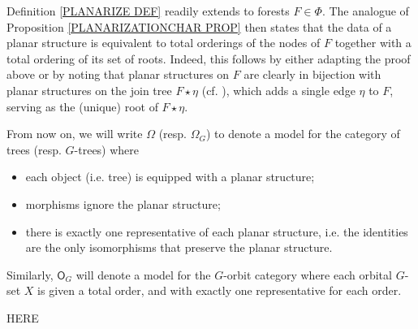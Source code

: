 \documentclass[a4paper,10pt]{article}%
\begin{document}
\begin{remark}
	Definition \ref{PLANARIZE DEF} readily extends to forests $F \in \Phi$. The analogue of Proposition \ref{PLANARIZATIONCHAR PROP} then states that the data of a planar structure is 
equivalent to total orderings of the nodes of $F$ together with a total ordering of its set of roots.
Indeed, this follows by either adapting the proof above or by noting that planar structures on $F$ are clearly in bijection with planar structures on the join tree $F \star \eta$ 
(cf. \cite[Def. 7.44]{Pe16b}), which adds a single edge $\eta$ to $F$, serving as the (unique) root of $F \star \eta$.
\end{remark}


\begin{convention}\label{PLANARCONV CON}
	From now on, we will write $\Omega$ (resp. $\Omega_G$) to denote a model for the category of trees (resp. $G$-trees) where
\begin{itemize}	
	\item each object (i.e. tree) is equipped with a planar structure;
	\item morphisms ignore the planar structure;
	\item there is exactly one representative of each planar structure, i.e. the identities are the only isomorphisms that preserve the planar structure.
\end{itemize}
Similarly, $\mathsf{O}_G$ will denote a model for the $G$-orbit category where each orbital $G$-set $X$ is given a total order, and with exactly one representative for each order.
\end{convention}

{\color{red} HERE}
\end{document}
